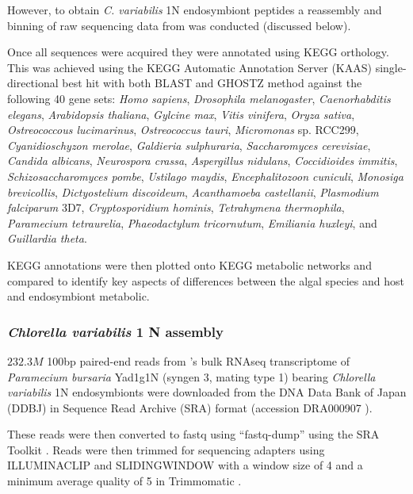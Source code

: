 However, to obtain \textit{C. variabilis} 1N endosymbiont peptides 
a reassembly and binning of raw sequencing data from \citep{Kodama2014}
was conducted (discussed below). 

Once all sequences were acquired they were annotated using KEGG
orthology.  This was achieved 
using the KEGG Automatic Annotation Server (KAAS) \citep{Moriya2007a}
single-directional best hit with both BLAST and GHOSTZ \citep{Suzuki2014,Suzuki2015} 
method against the following 40 gene sets: \textit{Homo sapiens}, 
\textit{Drosophila melanogaster}, \textit{Caenorhabditis elegans},
\textit{Arabidopsis thaliana}, \textit{Gylcine max},
\textit{Vitis vinifera}, \textit{Oryza sativa}, 
\textit{Ostreococcous lucimarinus}, \textit{Ostreococcus tauri},
\textit{Micromonas} sp. RCC299, \textit{Cyanidioschyzon merolae},
\textit{Galdieria sulphuraria}, \textit{Saccharomyces cerevisiae},
\textit{Candida albicans}, \textit{Neurospora crassa}, \textit{Aspergillus nidulans},
\textit{Coccidioides immitis}, \textit{Schizosaccharomyces pombe},
\textit{Ustilago maydis}, \textit{Encephalitozoon cuniculi},
\textit{Monosiga brevicollis}, \textit{Dictyostelium discoideum}, 
\textit{Acanthamoeba castellanii}, \textit{Plasmodium falciparum} 3D7, 
\textit{Cryptosporidium hominis}, \textit{Tetrahymena thermophila},
\textit{Paramecium tetraurelia}, \textit{Phaeodactylum tricornutum},
\textit{Emiliania huxleyi}, and \textit{Guillardia theta}.

KEGG annotations were then plotted onto KEGG metabolic networks and compared 
to identify key aspects of differences between the algal species and
host and endosymbiont metabolic.

\subsubsection{\textit{Chlorella variabilis} 1 N assembly}
\(232.3M\) 100bp paired-end reads from \citep{Kodama2014}'s 
bulk RNAseq transcriptome of \textit{Paramecium bursaria} Yad1g1N (syngen
3, mating type 1) bearing \textit{Chlorella variabilis} 1N endosymbionts
were downloaded from the DNA Data Bank of Japan (DDBJ) \citep{Tateno2002,Kaminuma2011}
in Sequence Read Archive (SRA) format \citep{Leinonen2011,KodamaNRA2012b} (accession DRA000907 \citet{Kodama2014}).

These reads were then converted to fastq using ``fastq-dump'' using the SRA Toolkit
\citep{NationalCenterforBiotechnologyInformation2011}.  Reads were then trimmed
for sequencing adapters using ILLUMINACLIP and SLIDINGWINDOW with a window size
of 4 and a minimum average quality of 5 in Trimmomatic \citep{Bolger2014a}.

